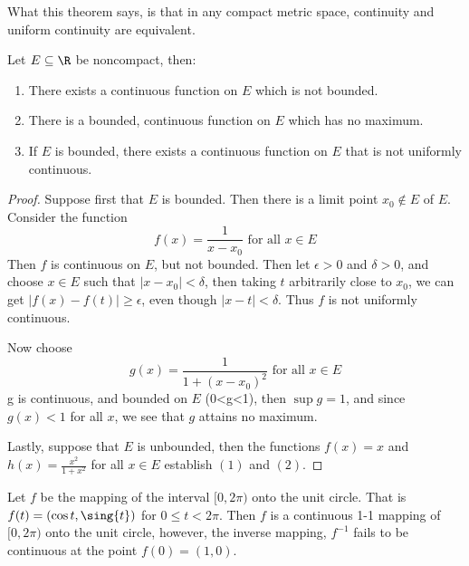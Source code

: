 \begin{remark}
    What this theorem says, is that in any compact metric space, continuity and uniform 
    continuity are equivalent.
\end{remark}

\begin{theorem}\label{5.3.7}
    Let $E \subseteq \R$ be noncompact, then:
        \begin{enumerate}[label=(\arabic*)]
            \item There exists a continuous function on $E$ which is not bounded.

            \item There is a bounded, continuous function on $E$ which has no maximum.

            \item If  $E$ is bounded, there exists a continuous function on  $E$ that is 
                not uniformly continuous.
        \end{enumerate}
\end{theorem}
\begin{proof}
    Suppose first that $E$ is bounded. Then there is a limit point  $x_0 \notin E$ of $E$. 
    Consider the function
        \begin{equation*}
            f(x)=\frac{1}{x-x_0} \text{ for all } x \in E
        \end{equation*}
    Then $f$ is continuous on  $E$, but not bounded. Then let  $\epsilon>0$ and  $\delta>0$, and 
    choose  $x \in E$ such that  $|x-x_0|<\delta$, then taking $t$ arbitrarily close to  $x_0$, 
    we can get $|f(x)-f(t)| \geq \epsilon$, even though  $|x-t|<\delta$. Thus  $f$ is not 
    uniformly continuous.

    Now choose 
        \begin{equation*}
            g(x)=\frac{1}{1+(x-x_0)^2} \text{ for all } x \in E
        \end{equation*}
    g is continuous, and bounded on $E$ (0<g<1), then $\sup{g}=1$, and since  $g(x)<1$ for all 
    $x$, we see that  $g$ attains no maximum.

    Lastly, suppose that $E$ is unbounded, then the functions  $f(x)=x$ and  $h(x)=\frac{x^2}{1+x^2}$ 
    for all $x \in E$ establish  $(1)$ and  $(2)$.
\end{proof}

\begin{example}
    Let $f$ be the mapping of the interval  $[0,2\pi)$ onto the unit circle. That is 
    $f(t)=(\cos{t},\sing{t})$ for  $0 \leq t<2\pi$. Then  $f$ is a continuous 1-1 mapping of 
    $[0,2\pi)$ onto the unit circle, however, the inverse mapping,  $f^{-1}$ fails to be 
    continuous at  the point $f(0)=(1,0)$.
\end{example} 
